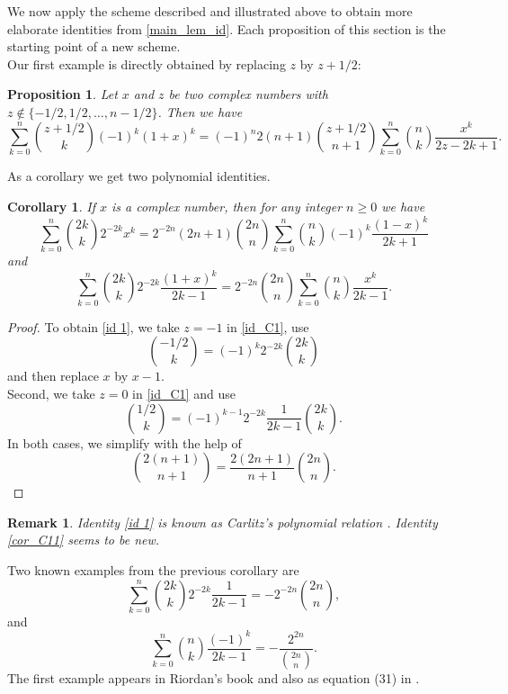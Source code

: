 \documentclass[10pt,a4paper]{amsart}
\numberwithin{equation}{section}
\newtheorem{proposition}[thm]{Proposition}
\newtheorem{corollary}[thm]{Corollary}
\newtheorem{remark}[thm]{Remark}
\begin{document}
We now apply the scheme described and illustrated above to obtain more elaborate identities from \eqref{main_lem_id}. 
Each proposition of this section is the starting point of a new scheme.\\

Our first example is directly obtained by replacing $z$ by $z+1/2$:
\begin{proposition}
Let $x$ and $z$ be two complex numbers with $z\notin\{-1/2,1/2,\ldots,n-1/2\}$. Then we have
\begin{equation}\label{id_C1}
\sum_{k=0}^n \binom{z+1/2}{k} (-1)^k (1+x)^k= (-1)^n 2(n+1) \binom{z+1/2}{n+1}\sum_{k=0}^n \binom{n}{k} \frac{x^k}{2z-2k+1}.
\end{equation}
\end{proposition}

As a corollary we get two polynomial identities.

\begin{corollary}\label{polynomial1}
If $x$ is a complex number, then for any integer $n\ge 0$ we have
\begin{equation}\label{id 1}
\sum_{k=0}^n \binom{2k}{k} 2^{-2k} x^k = 2^{-2n} (2n+1) \binom{2n}{n} \sum_{k=0}^n \binom{n}{k} (-1)^k \frac{(1-x)^k}{2k+1}
\end{equation}
and
\begin{equation}\label{cor_C11}
\sum_{k=0}^n \binom{2k}{k} 2^{-2k} \frac{(1+x)^k}{2k-1} = 2^{-2n} \binom{2n}{n} \sum_{k=0}^n \binom{n}{k} \frac{x^k}{2k-1}.
\end{equation}
\end{corollary}
\begin{proof}
To obtain \eqref{id 1}, we take $z=-1$ in \eqref{id_C1}, use 
$$\binom{-1/2}{k}=(-1)^k 2^{-2k}\binom{2k}{k}$$ 
and then replace $x$ by $x-1$. \\
Second, we take $z=0$ in \eqref{id_C1} and use 
$$\binom{1/2}{k}=(-1)^{k-1}2^{-2k}\frac{1}{2k-1}\binom{2k}{k}.$$ 
In both cases, we simplify with the help of
$$\binom{2(n+1)}{n+1} = \frac{2(2n+1)}{n+1} \binom{2n}{n}.$$
\end{proof}

\begin{remark}
Identity \eqref{id 1} is known as Carlitz's polynomial relation \cite{Carlitz}. Identity \eqref{cor_C11} seems to be new.
\end{remark}

Two known examples from the previous corollary are
$$\sum_{k=0}^n \binom{2k}{k} 2^{-2k} \frac{1}{2k-1} = -2^{-2n} \binom{2n}{n},$$
and
$$\sum_{k=0}^n \binom{n}{k} \frac{(-1)^k}{2k-1} = - \frac{2^{2n}}{\binom{2n}{n}}.$$
The first example appears in Riordan's book \cite[p. 130]{Riordan} and also as equation (31) in \cite{Adegoke}. \\
\end{document}

